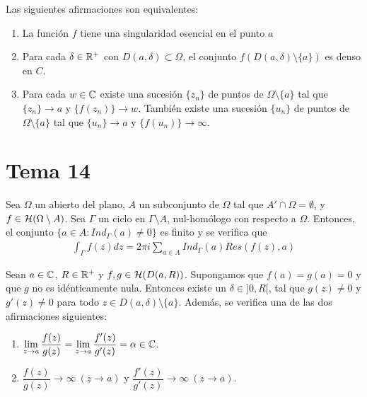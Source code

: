 \documentclass[12pt]{article}
\begin{document}
    \begin{teo} Las siguientes afirmaciones son equivalentes:
    \begin{enumerate}
        \item La función $f$ tiene una singularidad esencial en el punto $a$
        \item Para cada $\delta \in \mathbb{R}^+$ con $D(a, \delta)\subset \Omega$, el conjunto $f(D(a, \delta)\setminus \{a\})$ es denso en $C$.
        \item Para cada $w\in \mathbb{C}$ existe una sucesión $\{z_n\}$ de puntos de $\Omega \setminus \{a\}$ tal que $\{z_n\} \to a$ y $\{f(z_n)\}\to w$. También existe una sucesión $\{u_n\}$ de puntos de $\Omega \setminus \{a\}$ tal que $\{u_n\} \to a$ y $\{f(u_n)\} \to \infty$.
    \end{enumerate}
    \end{teo}

    \section{Tema 14}

    \begin{teo}
        Sea $\Omega$ un abierto del plano, $A$ un subconjunto de $\Omega$ tal que $A'\cap \Omega = \emptyset$, y $f\in \mathcal{H}(\Omega \setminus A)$. Sea $\Gamma$ un ciclo en $\Gamma \setminus A$, nul-homólogo con respecto a $\Omega$. Entonces, el conjunto $\{a\in A : Ind_\Gamma(a)\neq 0\}$ es finito y se verifica que
        \begin{gather*}
            \int_\Gamma f(z)dz = 2\pi i \sum\limits_{a\in A} Ind_\Gamma (a) Res(f(z), a)
        \end{gather*}
    \end{teo}

    \begin{teo} Sean $a\in \mathbb{C}$, $R\in \mathbb{R}^+$ y $f,g\in \mathcal{H}(D(a, R))$. Supongamos que $f(a)=g(a)=0$ y que $g$ no es idénticamente nula. Entonces existe un $\delta \in ]0,R[$, tal que $g(z)\neq 0$ y $g'(z)\neq 0$ para todo $z\in D(a, \delta)\setminus \{a\}$. Además, se verifica una de las dos afirmaciones siguientes:
    \begin{enumerate}
        \item $\displaystyle \lim\limits_{z\to a} \frac{f(z)}{g(z)} = \lim\limits_{z\to a} \frac{f'(z)}{g'(z)} = \alpha \in \mathbb{C}$.
        \item $\dfrac{f(z)}{g(z)} \to \infty\  (z \to a)$ y $\dfrac{f'(z)}{g'(z)} \to \infty\ (z \to a)$.
    \end{enumerate}
        
    \end{teo}
    
\end{document}
